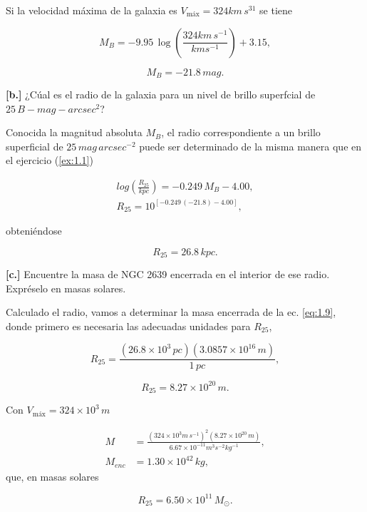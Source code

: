 \documentclass[paper=a4, fontsize=10pt]{scrartcl} %
\begin{document}
Si la velocidad máxima de la galaxia es $V_{\text{máx}} = 324 km\, s^{31}$ se tiene 

$$M_B = -9.95 \, \log \left(\frac{324 km\, s^{-1}}{kms^{-1}} \right) + 3.15,$$ 

\begin{equation} \label{eq:1.16}
M_B = -21.8 \, mag.
\end{equation}

{\bf{[b.]}} ¿Cúal es el radio de la galaxia para un nivel de brillo superfcial de $25 \, B-mag -arcsec^2$?

Conocida la magnitud absoluta  $M_B$, el radio correspondiente a un brillo superficial de $25 \, mag \, arcsec^{-2}$ puede ser determinado de la misma manera que en el ejercicio (\ref{ex:1.1}) 

\begin{align*} 
log \left(\frac{R_{25}}{kpc} \right) = -0.249 \, M_B - 4.00, \\
R_{25} = 10^{[-0.249 \, (-21.8) - 4.00]},
\end{align*} 

obteniéndose 

\begin{equation} \label{eq:1.17}
R_{25} = 26.8 \, kpc.
\end{equation}

 

{\bf{[c.]}}  Encuentre la masa de NGC 2639 encerrada en el interior de ese radio. Expréselo en masas solares.

Calculado el radio, vamos a determinar la masa encerrada de la ec. \eqref{eq:1.9}, donde primero es necesaria las adecuadas unidades para $R_{25}$, 

$$ R_{25} = \frac{(26.8 \times 10^3 \, pc)(3.0857 \times 10^{16} \, m)}{1 \, pc},$$

\begin{equation} \label{eq:1.18}
R_{25} = 8.27 \times 10^{20} \, m.
\end{equation}

Con $V_{\text{máx}} = 324 \times 10^3 \,m$

\begin{align*}
 M & = \frac{(324 \times 10^3 m\, s^{-1})^2 (8.27 \times 10^{20} \, m)}{6.67 \times 10^{-11} m^3 s^{-2} kg^{-1}}, \\
 M_{enc} & = 1.30 \times 10^{42} \, kg, 
 \end{align*}
 que, en masas solares 

 \begin{equation} \label{eq:1.19}
R_{25} = 6.50 \times 10^{11} \, M_{\odot}.
\end{equation}
 
\end{document}

